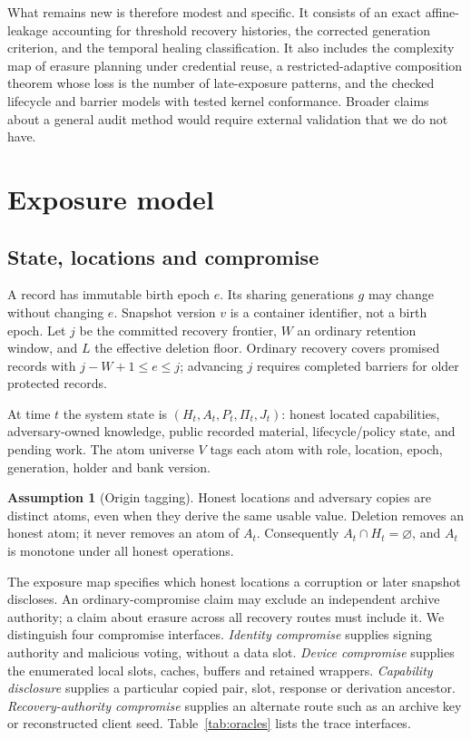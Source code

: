 \documentclass[pdflatex,sn-mathphys-num]{sn-jnl}
\theoremstyle{plain}
\theoremstyle{definition}
\newtheorem{assumption}{Assumption}
\begin{document}
What remains new is therefore modest and specific. It consists of an exact affine-leakage accounting for threshold recovery histories, the corrected generation criterion, and the temporal healing classification. It also includes the complexity map of erasure planning under credential reuse, a restricted-adaptive composition theorem whose loss is the number of late-exposure patterns, and the checked lifecycle and barrier models with tested kernel conformance. Broader claims about a general audit method would require external validation that we do not have.


\section{Exposure model}\label{sec:model}

\subsection{State, locations and compromise}
A record has immutable birth epoch $e$. Its sharing generations $g$ may change without changing $e$. Snapshot version $v$ is a container identifier, not a birth epoch. Let $j$ be the committed recovery frontier, $W$ an ordinary retention window, and $L$ the effective deletion floor. Ordinary recovery covers promised records with $j-W+1\le e\le j$; advancing $j$ requires completed barriers for older protected records.

At time $t$ the system state is $(H_t,A_t,P_t,\Pi_t,J_t)$: honest located capabilities, adversary-owned knowledge, public recorded material, lifecycle/policy state, and pending work. The atom universe $V$ tags each atom with role, location, epoch, generation, holder and bank version.

\begin{assumption}[Origin tagging]\label{ass:origin}
Honest locations and adversary copies are distinct atoms, even when they derive the same usable value. Deletion removes an honest atom; it never removes an atom of $A_t$. Consequently $A_t\cap H_t=\varnothing$, and $A_t$ is monotone under all honest operations.
\end{assumption}

The exposure map specifies which honest locations a corruption or later snapshot discloses. An ordinary-compromise claim may exclude an independent archive authority; a claim about erasure across all recovery routes must include it. We distinguish four compromise interfaces. \emph{Identity compromise} supplies signing authority and malicious voting, without a data slot. \emph{Device compromise} supplies the enumerated local slots, caches, buffers and retained wrappers. \emph{Capability disclosure} supplies a particular copied pair, slot, response or derivation ancestor. \emph{Recovery-authority compromise} supplies an alternate route such as an archive key or reconstructed client seed. Table~\ref{tab:oracles} lists the trace interfaces.
\end{document}
